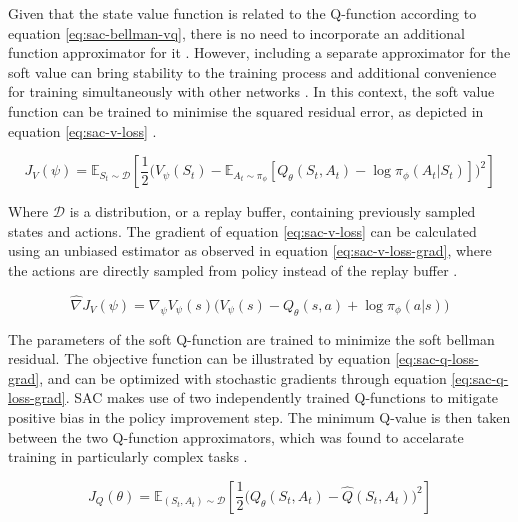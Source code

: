 Given that the state value function is related to the Q-function according to equation \ref{eq:sac-bellman-vq}, there is no need to incorporate an additional function approximator for it \cite{haarnojaSoftActorCriticOffPolicy2018}. However, including a separate approximator for the soft value can bring stability to the training process and additional convenience for training simultaneously with other networks \cite{haarnojaSoftActorCriticOffPolicy2018}. In this context, the soft value function can be trained to minimise the squared residual error, as depicted in equation \ref{eq:sac-v-loss} \cite{haarnojaSoftActorCriticOffPolicy2018}.

\begin{equation} \label{eq:sac-v-loss}
J_V(\psi) = \mathbb{E}_{S_t \sim \mathcal{D}} \left[ \frac{1}{2} \Big( V_\psi(S_t) - \mathbb{E}_{A_t \sim \pi_\phi} [Q_\theta (S_t, A_t) - \log \pi_\phi (A_t | S_t)] \Big)^2 \right]
\end{equation}

Where $\mathcal{D}$ is a distribution, or a replay buffer, containing previously sampled states and actions. The gradient of equation \ref{eq:sac-v-loss} can be calculated using an unbiased estimator as observed in equation \ref{eq:sac-v-loss-grad}, where the actions are directly sampled from policy instead of the replay buffer \cite{haarnojaSoftActorCriticOffPolicy2018}.

\begin{equation} \label{eq:sac-v-loss-grad}
\hat{\nabla} J_V(\psi) = \nabla_\psi V_\psi (s) \Big( V_\psi(s) - Q_\theta (s, a) + \log \pi_\phi (a | s) \Big)
\end{equation}

The parameters of the soft Q-function are trained to minimize the soft bellman residual. The objective function can be illustrated by equation \ref{eq:sac-q-loss-grad}, and can be optimized with stochastic gradients through equation \ref{eq:sac-q-loss-grad}. \ac{SAC} makes use of two independently trained Q-functions to mitigate positive bias in the policy improvement step. The minimum Q-value is then taken between the two Q-function approximators, which was found to accelarate training in particularly complex tasks \cite{openaiSpinningDocumentation, haarnojaSoftActorCriticOffPolicy2018}.

\begin{equation} \label{eq:sac-q-loss}
J_Q(\theta) = \mathbb{E}_{(S_t, A_t) \sim \mathcal{D}} \left[ \frac{1}{2} \Big( Q_\theta (S_t, A_t) - \hat{Q}(S_t, A_t) \Big)^2 \right]
\end{equation}

